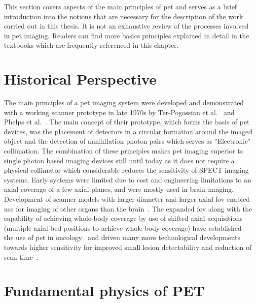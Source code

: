 This section covers aspects of the main principles of \gls{pet} and serves as a brief introduction into the notions that are necessary for the description of the work carried out in this thesis. It is not an exhaustive review of the processes involved in \gls{pet} imaging. Readers can find more basics principles explained in detail in the textbooks which are frequently referenced in this chapter.

\section{Historical Perspective}
The main principles of a \Gls{pet} imaging system were developed and demonstrated with a working scanner prototype in late 1970s by Ter-Pogossian et al.~\cite{Ter-Pogossian1975} and Phelps et al.~\cite{Phelps1975}. The main concept of their prototype, which forms the basis of \gls{pet} devices, was the placement of detectors in a circular formation around the imaged object and the detection of annihilation photon pairs which serves as "Electronic" collimation. The combination of these principles makes \gls{pet} imaging superior to single photon based imaging devices still until today as it does not require a physical collimator which considerable reduces the sensitivity of SPECT imaging systems.
Early systems were limited due to cost and engineering limitations to an axial coverage of a few axial planes, and were mostly used in brain imaging. Development of scanner models with larger diameter and larger axial \gls{fov} enabled use for imaging of other organs than the brain~\cite{Nutt2002}.%
The expanded \gls{fov} along with the capability of achieving whole-body coverage by use of shifted axial acquisitions~\cite{Dahlbom1992} (multiple axial bed positions to achieve whole-body coverage) have established the use of \gls{pet} in oncology~\cite{Bomanji2001} and driven many more technological developments towards higher sensitivity for improved small lesion detectability and reduction of scan time~\cite{Jones2017}.


\section{Fundamental physics of PET}

